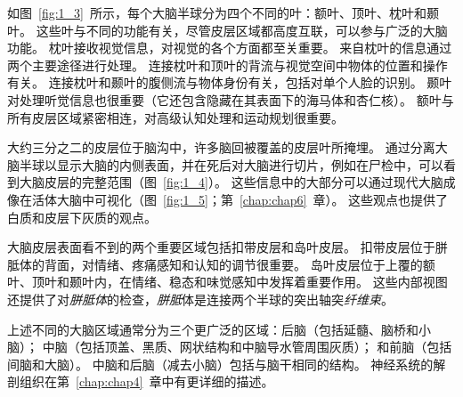 \begin{proposition}[中枢神经系统的解剖学组织]
	\quad \quad 如图~\ref{fig:1_3}~所示，每个大脑半球分为四个不同的叶：额叶、顶叶、枕叶和颞叶。
	这些叶与不同的功能有关，尽管皮层区域都高度互联，可以参与广泛的大脑功能。
	枕叶接收视觉信息，对视觉的各个方面都至关重要。
	来自枕叶的信息通过两个主要途径进行处理。
	连接枕叶和顶叶的背流与视觉空间中物体的位置和操作有关。
	连接枕叶和颞叶的腹侧流与物体身份有关，包括对单个人脸的识别。
	颞叶对处理听觉信息也很重要（它还包含隐藏在其表面下的海马体和杏仁核）。
	额叶与所有皮层区域紧密相连，对高级认知处理和运动规划很重要。
	
	\quad \quad 大约三分之二的皮层位于脑沟中，许多脑回被覆盖的皮层叶所掩埋。
	通过分离大脑半球以显示大脑的内侧表面，并在死后对大脑进行切片，例如在尸检中，可以看到大脑皮层的完整范围（图~\ref{fig:1_4}）。
	这些信息中的大部分可以通过现代大脑成像在活体大脑中可视化（图~\ref{fig:1_5}；第~\ref{chap:chap6}~章）。
	这些观点也提供了白质和皮层下灰质的观点。
	
	\quad \quad 大脑皮层表面看不到的两个重要区域包括扣带皮层和岛叶皮层。
	扣带皮层位于胼胝体的背面，对情绪、疼痛感知和认知的调节很重要。
	岛叶皮层位于上覆的额叶、顶叶和颞叶内，在情绪、稳态和味觉感知中发挥着重要作用。
	这些内部视图还提供了对\textit{胼胝体}的检查，\textit{胼胝}体是连接两个半球的突出轴突\textit{纤维束}。
	
	上述不同的大脑区域通常分为三个更广泛的区域：后脑（包括延髓、脑桥和小脑）；
	中脑（包括顶盖、黑质、网状结构和中脑导水管周围灰质）；
	和前脑（包括间脑和大脑）。
	中脑和后脑（减去小脑）包括与脑干相同的结构。
	神经系统的解剖组织在第~\ref{chap:chap4}~章中有更详细的描述。
		
\end{proposition}


